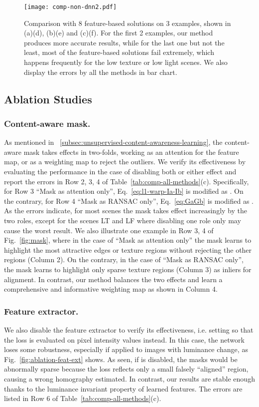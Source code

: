 \documentclass[runningheads]{llncs}
\begin{document}
\begin{figure}[t]
  \centering
  \texttt{[image: comp-non-dnn2.pdf]}
  \caption{Comparison with 8 feature-based solutions on 3 examples, shown in (a)(d), (b)(e) and (c)(f). For the first 2 examples, our method produces more accurate results, while for the last one but not the least, most of the feature-based solutions fail extremely, which happens frequently for the low texture or low light scenes. We also display the errors by all the methods in bar chart.}\label{fig:feature_failure}
\end{figure}




\subsection{Ablation Studies}

\subsubsection{Content-aware mask.}\label{subsec:ablation-content-aware-mask}
As mentioned in \secname~\ref{subsec:unsupervised-content-awareness-learning}, the content-aware mask takes effects in two-folds, working as an attention for the feature map, or as a weighting map to reject the outliers.
We verify its effectiveness by evaluating the performance in the case of disabling both or either effect and report the errors in Row 2, 3, 4 of Table~\ref{tab:comp-all-methods}(c).
Specifically, for Row 3 ``Mask as attention only'', Eq.~\ref{eq:l1-warp-Ia-Ib} is modified as . On the contrary, for Row 4 ``Mask as RANSAC only'', Eq.~\ref{eq:GaGb} is modified as . As the errors indicate, for most scenes the mask takes effect increasingly by the two roles, except for the scenes LT and LF where disabling one role only may cause the worst result. We also illustrate one example in Row 3, 4 of Fig.~\ref{fig:mask}, where in the case of ``Mask as attention only'' the mask learns to highlight the most attractive edges or texture regions without rejecting the other regions (Column 2). On the contrary, in the case of ``Mask as RANSAC only'', the mask learns to highlight only sparse texture regions (Column 3) as inliers for alignment. In contrast, our method balances the two effects and learn a comprehensive and informative weighting map as shown in Column 4. 

\subsubsection{Feature extractor.}
We also disable the feature extractor to verify its effectiveness, i.e. setting  so that the loss is evaluated on pixel intensity values instead. In this case, the network loses some robustness, especially if applied to images with luminance change, as Fig.~\ref{fig:ablation-feat-ext} shows. As seen, if  is disabled, the masks would be abnormally sparse because the loss reflects only a small falsely ``aligned'' region, causing a wrong homography estimated. In contrast, our results are stable enough thanks to the luminance invariant property of learned features. The errors are listed in Row 6 of Table~\ref{tab:comp-all-methods}(c). 
\end{document}
